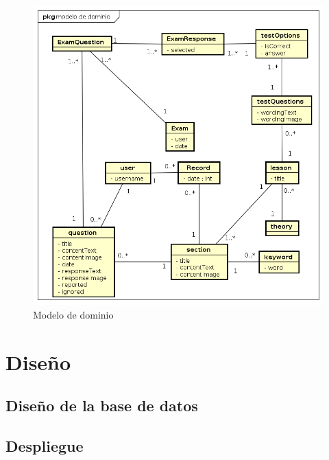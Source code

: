 \documentclass[openright,twoside,10pt]{book}
\begin{document}
    \begin{figure}[H]
        \begin{center}
            \includegraphics[width=\textwidth]{img/astah/analisis/dominio/modelo.png}
        \end{center}
        \caption{Modelo de dominio}
    \end{figure}
    
    \vspace*{\fill}
    
    \newpage
    
    \section{Diseño}\label{diseuxf1o}
    
    \subsection{Diseño de la base de
    datos}\label{diseuxf1o-de-la-base-de-datos}
    
    \newpage
    
    \subsection{Despliegue}\label{despliegue}
    
\end{document}
